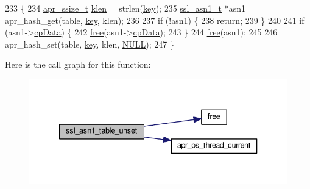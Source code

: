 \begin{DoxyCode}
233 \{
234     \hyperlink{group__apr__platform_ga215ebb88932bee220b766263ebbfe6fa}{apr\_ssize\_t} \hyperlink{group__apr__hash_ga339e1f6a04084df15b0761bf599c5ca7}{klen} = strlen(\hyperlink{group__MOD__CACHE_ga11d8023381192746eb96be162398fe1c}{key});
235     \hyperlink{structssl__asn1__t}{ssl\_asn1\_t} *asn1 = apr\_hash\_get(table, \hyperlink{group__MOD__CACHE_ga11d8023381192746eb96be162398fe1c}{key}, klen);
236 
237     \textcolor{keywordflow}{if} (!asn1) \{
238         \textcolor{keywordflow}{return};
239     \}
240 
241     \textcolor{keywordflow}{if} (asn1->\hyperlink{structssl__asn1__t_afa73bf65f652bd8d4bbc5e2a63353877}{cpData}) \{
242         \hyperlink{util__expr__parse_8c_af07d89f5ceaea0c7c8252cc41fd75f37}{free}(asn1->\hyperlink{structssl__asn1__t_afa73bf65f652bd8d4bbc5e2a63353877}{cpData});
243     \}
244     \hyperlink{util__expr__parse_8c_af07d89f5ceaea0c7c8252cc41fd75f37}{free}(asn1);
245 
246     apr\_hash\_set(table, \hyperlink{group__MOD__CACHE_ga11d8023381192746eb96be162398fe1c}{key}, klen, \hyperlink{pcre_8txt_ad7f989d16aa8ca809a36bc392c07fba1}{NULL});
247 \}
\end{DoxyCode}


Here is the call graph for this function\+:
\nopagebreak
\begin{figure}[H]
\begin{center}
\leavevmode
\includegraphics[width=340pt]{group__MOD__SSL__PRIVATE_ga972e87f81ab1284799009ada4b0c747e_cgraph}
\end{center}
\end{figure}


